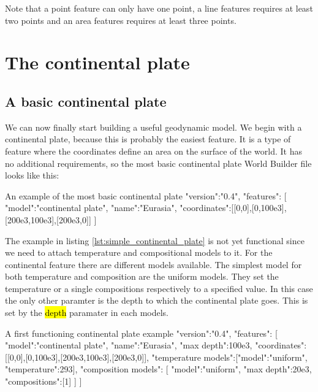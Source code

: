 \documentclass{book}
\newcommand{\WB}{{World Builder}}
\begin{document}
\begin{remark}
Note that a point feature can only have one point, a line features requires at least two points and an area features requires at least three points.
\end{remark}

\section{The continental plate}
\label{section:continetnal_plate}
\subsection{A basic continental plate}
We can now finally start building a useful geodynamic model. We begin with a continental plate, because this is probably the easiest feature. It is a type of feature where the coordinates define an area on the surface of the world. It has no additional requirements, so the most basic continental plate \WB{} file looks like this:

\begin{javascriptcode}[label=lst:simple_continental_plate]{An example of the most basic continental plate}{}
{
  "version":"0.4",
  "features":
  [
    {
      "model":"continental plate", "name":"Eurasia",
      "coordinates":[[0,0],[0,100e3],[200e3,100e3],[200e3,0]]
    }
  ]
}
\end{javascriptcode}

The example in listing \ref{lst:simple_continental_plate} is not yet functional since we need to attach temperature and compositional models to it. For the continental feature there are different models available. The simplest model for both temperature and composition are the uniform models. They set the temperature or a single compositions respectively to a specified value. In this case the only other paramter is the depth to which the continental plate goes. This is set by the \hl{depth} paramater in each models.

\begin{javascriptcode}{A first functioning continental plate example}{}
{
  "version":"0.4",
  "features":
  [
    {
      "model":"continental plate", "name":"Eurasia", "max depth":100e3,
      "coordinates":[[0,0],[0,100e3],[200e3,100e3],[200e3,0]],
      "temperature models":[{"model":"uniform", "temperature":293}],
      "composition models":
      [
        {"model":"uniform", "max depth":20e3, "compositions":[1]}
      ]
    }
  ]
}
\end{javascriptcode}
\end{document}
